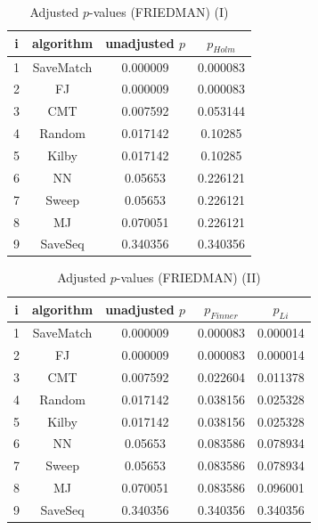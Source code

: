 \documentclass[a4paper,10pt]{article}
\begin{document}
\begin{landscape}
\begin{table}[!htp]
\centering\small
\begin{tabular}{cccc}
i&algorithm&unadjusted $p$&$p_{Holm}$\\
\hline1&SaveMatch&0.000009&0.000083\\2&FJ&0.000009&0.000083\\3&CMT&0.007592&0.053144\\4&Random&0.017142&0.10285\\5&Kilby&0.017142&0.10285\\6&NN&0.05653&0.226121\\7&Sweep&0.05653&0.226121\\8&MJ&0.070051&0.226121\\9&SaveSeq&0.340356&0.340356\\\hline
\end{tabular}
\caption{Adjusted $p$-values (FRIEDMAN) (I)}
\end{table}
\begin{table}[!htp]
\centering\small
\begin{tabular}{ccccc}
i&algorithm&unadjusted $p$&$p_{Finner}$&$p_{Li}$\\
\hline1&SaveMatch&0.000009&0.000083&0.000014\\2&FJ&0.000009&0.000083&0.000014\\3&CMT&0.007592&0.022604&0.011378\\4&Random&0.017142&0.038156&0.025328\\5&Kilby&0.017142&0.038156&0.025328\\6&NN&0.05653&0.083586&0.078934\\7&Sweep&0.05653&0.083586&0.078934\\8&MJ&0.070051&0.083586&0.096001\\9&SaveSeq&0.340356&0.340356&0.340356\\\hline
\end{tabular}
\caption{Adjusted $p$-values (FRIEDMAN) (II)}
\end{table}

\newpage
\end{landscape}
\end{document}
